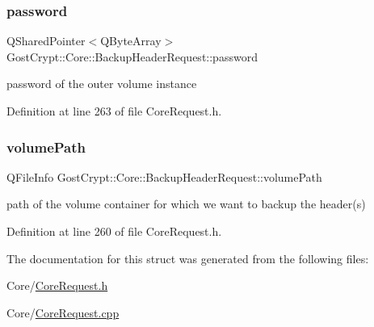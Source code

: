\subsubsection{\texorpdfstring{password}{password}}
{\footnotesize\ttfamily Q\+Shared\+Pointer$<$Q\+Byte\+Array$>$ Gost\+Crypt\+::\+Core\+::\+Backup\+Header\+Request\+::password}

password of the outer volume instance 

Definition at line 263 of file Core\+Request.\+h.

\mbox{\label{struct_gost_crypt_1_1_core_1_1_backup_header_request_aa29012df2d35f163a525f2577f30ab49}} 
\subsubsection{\texorpdfstring{volume\+Path}{volumePath}}
{\footnotesize\ttfamily Q\+File\+Info Gost\+Crypt\+::\+Core\+::\+Backup\+Header\+Request\+::volume\+Path}

path of the volume container for which we want to backup the header(s) 

Definition at line 260 of file Core\+Request.\+h.



The documentation for this struct was generated from the following files\+:\begin{DoxyCompactItemize}
\item 
Core/\hyperlink{_core_request_8h}{Core\+Request.\+h}\item 
Core/\hyperlink{_core_request_8cpp}{Core\+Request.\+cpp}\end{DoxyCompactItemize}
